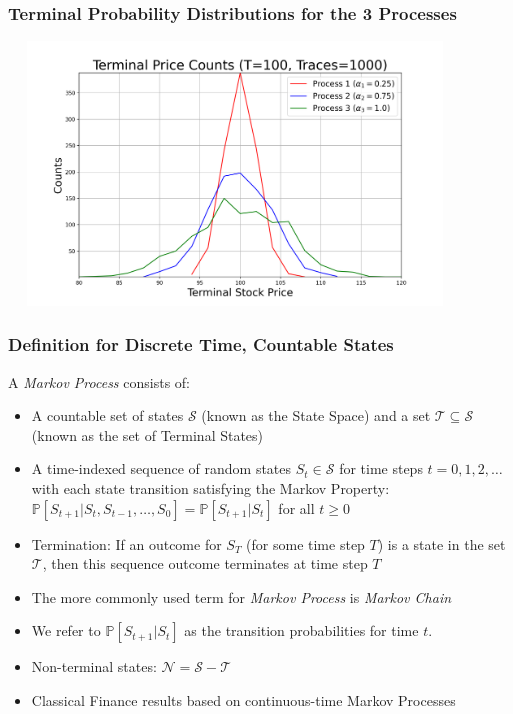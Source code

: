 \documentclass[handout]{beamer}
\begin{document}
\begin{frame}
\frametitle{Terminal Probability Distributions for the 3 Processes}
\includegraphics[width=12cm, height=7cm]{terminal_distribution.png}
\end{frame}

\begin{frame}
\frametitle{Definition for Discrete Time, Countable States}
\pause
\begin{definition}
A {\em Markov Process} consists of:
\begin{itemize}
\item A countable set of states $\mathcal{S}$ (known as the State Space) and a set $\mathcal{T} \subseteq \mathcal{S}$ (known as the set of Terminal States)
\item A time-indexed sequence of random states $S_t \in \mathcal{S}$ for time steps $t=0, 1, 2, \ldots$ with each state transition satisfying the Markov Property: $\mathbb{P}[S_{t+1}|S_t, S_{t-1}, \ldots, S_0] = \mathbb{P}[S_{t+1}|S_t]$ for all $t \geq 0$
\item Termination: If an outcome for $S_T$ (for some time step $T$) is a state in the set $\mathcal{T}$, then this sequence outcome terminates at time step $T$
\end{itemize}
\end{definition}
\pause
\begin{itemize}[<+->]
\item The more commonly used term for {\em Markov Process} is {\em Markov Chain}
\item We refer to $\mathbb{P}[S_{t+1}|S_t]$ as the transition probabilities for time $t$.
\item Non-terminal states: $\mathcal{N} = \mathcal{S} - \mathcal{T}$
\item Classical Finance results based on continuous-time Markov Processes
\end{itemize}
\end{frame}
\end{document}
